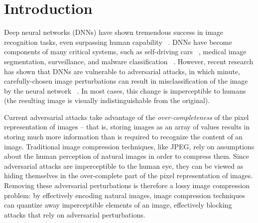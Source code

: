 \section{Introduction}
Deep neural networks (DNNs) have shown tremendous success in image recognition tasks, even surpassing human capability ~\cite{He2016DeepRL}. 
DNNs have become components of many critical systems, such as self-driving cars ~\cite{bojarski2016end}, medical image segmentation, surveillance, and  malware classification ~\cite{pascanu2015malware}. However, recent research has shown that DNNs are vulnerable to adversarial attacks, in which minute, carefully-chosen image perturbations can result in misclassification of the image by the neural network ~\cite{Goodfellow2014ExplainingAH}.
In most cases, this change is imperceptible to humans (the resulting image is visually indistinguishable from the original).


Current adversarial attacks take advantage of the \emph{over-completeness} of the pixel representation of images -- that is, storing images as an array of values results in storing much more information than is required to recognize the content of an image. Traditional image compression techniques, like JPEG, rely on assumptions about the human perception of natural images in order to compress them. Since adversarial attacks are imperceptible to the human eye, they can be viewed as hiding themselves in the over-complete part of the pixel representation of images. Removing these adversarial perturbations is therefore a lossy image compression problem: by effectively encoding natural images, image compression techniques can quantize away imperceptible elements of an image, effectively blocking attacks that rely on adversarial perturbations.


